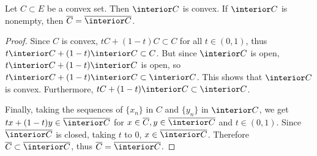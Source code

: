 \begin{lemma} Let $C\subset E$ be a convex set. Then $\interior C$ is convex. If $\interior C$ is nonempty, then $\overline{C}=\overline{\interior C}$.
\end{lemma}
\begin{proof} Since $C$ is convex, $tC+(1-t)C\subset C$ for all $t\in 
(0,1)$, thus $t\interior C+(1-t)\interior C\subset C$. But since $\interior C$ is open, $t\interior C+(1-t)\interior C$ is open, so $t\interior C+(1-t)\interior C\subset \interior C$. This shows that $\interior C$ is convex. Furthermore, $tC+(1-t)\interior C\subset \interior C$.

Finally, taking the sequences of $\{x_n\}$ in $C$ and $\{y_n\}$ in $\interior C$, we get $tx+(1-t)y\in \overline{\interior C}$ for $x\in \overline{C}, y\in \overline{\interior C}$ and $t\in (0,1)$. Since $\overline{\interior C}$ is closed, taking $t$ to $0$, $x\in \overline{\interior C}$. Therefore $\overline{C}\subset \overline{\interior C}$, thus $\overline{C}=\overline{\interior C}$.
\end{proof}

